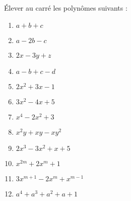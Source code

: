 \begin{exercice}\'Elever au carré les polynômes suivants :
\begin{multicols}{2}
\begin{enumerate}
\item $a+b+c$	
\item $a-2b-c$	
\item $2x-3y+z$	
\item $a-b+c-d$	
\item $2{{x}^{2}}+3x-1$	
\item $3{{x}^{2}}-4x+5$	
\item ${{x}^{4}}-2{{x}^{2}}+3$	
\item ${{x}^{2}}y+xy-x{{y}^{2}}$	
\item $2{{x}^{3}}-3{{x}^{2}}+x+5$
\item ${{x}^{2m}}+2{{x}^{m}}+1$
\item $3{{x}^{m+1}}-2{{x}^{m}}+{{x}^{m-1}}$
\item ${{a}^{4}}+{{a}^{3}}+{{a}^{2}}+a+1$
\end{enumerate}
\end{multicols}
\end{exercice}

